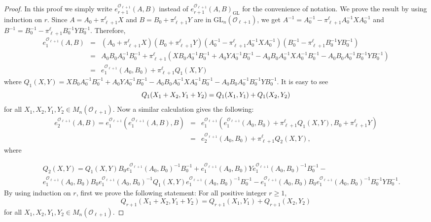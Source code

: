 \documentclass[10pt,twoside]{amsart}
\newcommand{\GL}{\mathrm{GL}}
\theoremstyle{definition}
\theoremstyle{definition}
\begin{document}
\begin{proof}
In this proof we simply write $e_{r+1}^{\mathcal{O}_{\ell+1}}(A, B)$ instead of $e_{r+1}^{\mathcal{O}_{\ell+1}}(A, B)_{\GL}$ for the convenience of notation. We prove the result by using induction on $r$. Since $A = A_0 + \pi_{\ell+1}^{\ell} X$ and $B = B_0 + \pi_{\ell+1}^{\ell} Y$ are in $\GL_n(\mathcal{O}_{\ell+1})$, we get $A^{-1}=A_0^{-1}-\pi_{\ell+1}^{\ell} A_0^{-1}XA_0^{-1}$ and $B^{-1}=B_0^{-1}-\pi_{\ell+1}^{\ell} B_0^{-1}YB_0^{-1}$. Therefore,
\begin{eqnarray*}
e_1^{\mathcal{O}_{\ell+1}}(A,B) &=& (A_0 + \pi_{\ell+1}^{\ell} X)(B_0+\pi_{\ell+1}^{\ell} Y)(A_0^{-1}-\pi_{\ell+1}^{\ell}A_0^{-1}XA_0^{-1})(B_0^{-1}-\pi_{\ell+1}^{\ell} B_0^{-1}YB_0^{-1}) \\ 
&=& A_0B_0A_0^{-1}B_0^{-1}+\pi_{\ell+1}^{\ell}(XB_0A_0^{-1}B_0^{-1}+A_0YA_0^{-1}B_0^{-1}-A_0B_0A_0^{-1}XA_0^{-1}B_0^{-1}-A_0B_0A_0^{-1}B_0^{-1}YB_0^{-1})\\
&=& e_1^{\mathcal{O}_{\ell+1}}(A_0, B_0) + \pi_{\ell+1}^{\ell} Q_1(X,Y) 
\end{eqnarray*}
where $Q_1(X,Y) = XB_0A_0^{-1}B_0^{-1} + A_0YA_0^{-1}B_0^{-1} -A_0 B_0 A_0^{-1}XA_0^{-1} B_0^{-1} -A_0 B_0 A_0^{-1} B_0^{-1} Y B_0^{-1}$. It is easy to see 
\begin{equation}{\label{coordinate linearity of Q1}}
     Q_1(X_1+X_2,Y_1+Y_2)=Q_1(X_1,Y_1)+Q_1(X_2,Y_2)
\end{equation}
for all $X_1,X_2,Y_1,Y_2\in M_n(\mathcal{O}_{\ell+1})$. Now a similar calculation gives the following:
\begin{eqnarray*}
e_2^{\mathcal{O}_{\ell+1}}(A,B) = e_1^{\mathcal{O}_{\ell+1}}(e_1^{\mathcal{O}_{\ell+1}}(A,B),B) &=& e_1^{\mathcal{O}_{\ell+1}}(e_1^{\mathcal{O}_{\ell+1}}(A_0,B_0)+\pi_{\ell+1}^{\ell} Q_1(X,Y),B_0+\pi_{\ell+1}^{\ell} Y) \\ 
&=& e_2^{\mathcal{O}_{\ell+1}}(A_0,B_0)+\pi_{\ell+1}^{\ell} Q_2(X,Y),
\end{eqnarray*}
where 

\begin{eqnarray*}
&&Q_2(X,Y)=Q_1(X,Y)B_0e_1^{\mathcal{O}_{\ell+1}}(A_0,B_0)^{-1}B_0^{-1}+e_1^{\mathcal{O}_{\ell+1}}(A_0,B_0)Ye_1^{\mathcal{O}_{\ell+1}}(A_0,B_0)^{-1}B_0^{-1}- \\ &&e_1^{\mathcal{O}_{\ell+1}}(A_0,B_0)B_0e_1^{\mathcal{O}_{\ell+1}}(A_0,B_0)^{-1}Q_1(X,Y)e_1^{\mathcal{O}_{\ell+1}}(A_0,B_0)^{-1}B_0^{-1}-e_1^{\mathcal{O}_{\ell+1}}(A_0,B_0)B_0e_1^{\mathcal{O}_{\ell+1}}(A_0,B_0)^{-1}B_0^{-1}YB_0^{-1}.
\end{eqnarray*}
By using induction on $r$, first we prove the following statement: For all positive integer $r\geq 1$, $$Q_{r+1}(X_1+X_2,Y_1+Y_2)=Q_{r+1}(X_1,Y_1)+Q_{r+1}(X_2,Y_2)$$ for all $X_1,X_2,Y_1,Y_2\in M_n(\mathcal{O}_{\ell+1})$.
    

\end{proof}
\end{document}
